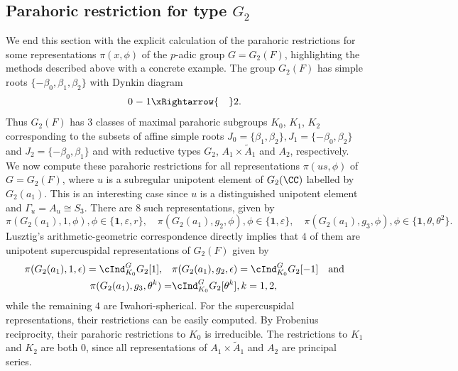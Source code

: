 \subsection{Parahoric restriction for type \texorpdfstring{$G_2$}{PDFstring}}
We end this section with the explicit calculation of the parahoric restrictions for some representations $\pi(x,\phi)$ of the $p$-adic group $G=G_2(F)$, highlighting the methods described above with a concrete example. The group $G_2(F)$ has simple roots $\{-\beta_0,\beta_1,\beta_2\}$ with Dynkin diagram 
\[
    0 \relbar 1 \xRightarrow{\quad} 2.
\]
Thus $G_2(F)$ has $3$ classes of maximal parahoric subgroups $K_0$, $K_1$, $K_2$ corresponding to the subsets of affine simple roots $J_0=\{\beta_1,\beta_2\}, J_1=\{-\beta_0,\beta_2\}$ and $J_2=\{-\beta_0,\beta_1\}$ and with reductive types $G_2$, $A_1\times \tilde{A}_1$ and $A_2$, respectively. We now compute these parahoric restrictions for all representations $\pi(us,\phi)$ of $G=G_2(F)$, where $u$ is a subregular unipotent element of $G_2(\CC)$ labelled by $G_2(a_1)$. This is an interesting case since $u$ is a distinguished unipotent element and $\Gamma_u=A_u\cong S_3$. There are $8$ such representations, given by 
$$\pi(G_2(a_1),1,\phi),\phi\in\{\mathbf{1},\varepsilon,r\},\quad\pi(G_2(a_1),g_2,\phi),\phi\in\{\mathbf{1},\varepsilon\},\quad\pi(G_2(a_1),g_3,\phi),\phi\in\{\mathbf{1},\theta,\theta^2\}.$$
Lusztig's arithmetic-geometric correspondence directly implies that $4$ of them are unipotent supercuspidal representations of $G_2(F)$ given by 
\begin{align*}
    \pi(G_2(a_1),1,\epsilon)=\cInd_{K_0}^{G}G_2[1],\quad&\pi(G_2(a_1),g_2,\epsilon)=\cInd_{K_0}^{G}G_2[-1]\quad\text{and}\\
    \quad\pi(G_2(a_1),g_3,\theta^k)=&\cInd_{K_0}^{G}G_2[\theta^k], k=1,2,
\end{align*}
while the remaining $4$ are Iwahori-spherical. 
For the supercuspidal representations, their restrictions can be easily computed. By Frobenius reciprocity, their parahoric restrictions to $K_0$ is irreducible. The restrictions to $K_1$ and $K_2$ are both $0$, since all representations of $A_1\times \tilde{A}_1$ and $A_2$ are principal series. 

